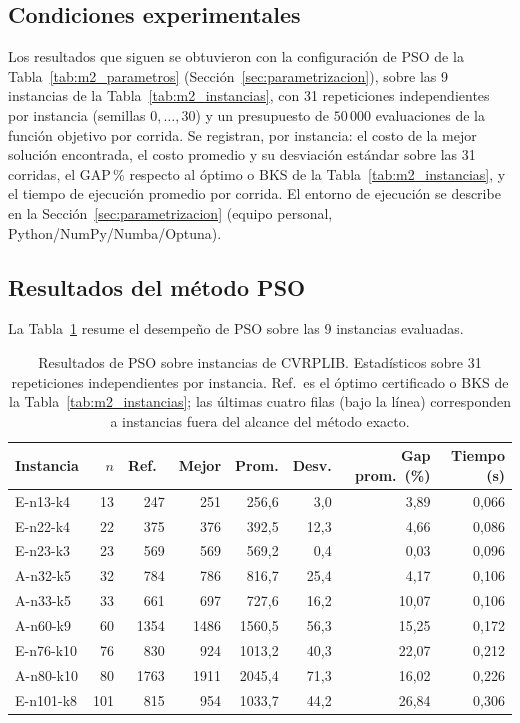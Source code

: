 \subsection{Condiciones experimentales}

Los resultados que siguen se obtuvieron con la configuración de PSO de la
Tabla~\ref{tab:m2_parametros} (Sección~\ref{sec:parametrizacion}), sobre las 9 instancias
de la Tabla~\ref{tab:m2_instancias}, con 31 repeticiones independientes por
instancia (semillas $0,\ldots,30$) y un presupuesto de $50\,000$ evaluaciones de la
función objetivo por corrida. Se registran, por instancia: el costo de la mejor solución
encontrada, el costo promedio y su desviación estándar sobre las 31 corridas, el GAP\,\%
respecto al óptimo o BKS de la Tabla~\ref{tab:m2_instancias}, y el tiempo de ejecución
promedio por corrida. El entorno de ejecución se describe en la
Sección~\ref{sec:parametrizacion} (equipo personal, Python/NumPy/Numba/Optuna).

\subsection{Resultados del método PSO}

La Tabla~\ref{tab:m2_resultados_pso} resume el desempeño de PSO sobre las 9 instancias
evaluadas.

\begin{table}[H]
\centering
\caption{Resultados de PSO sobre instancias de CVRPLIB. Estadísticos sobre 31 repeticiones
independientes por instancia. Ref.\ es el óptimo certificado o BKS de la
Tabla~\ref{tab:m2_instancias}; las últimas cuatro filas (bajo la línea) corresponden a
instancias fuera del alcance del método exacto.}
\label{tab:m2_resultados_pso}
\begin{tabular}{lrrrrrrr}
\hline
Instancia & $n$ & Ref.\ & Mejor & Prom. & Desv. & Gap prom.\ (\%) & Tiempo (s) \\
\hline
E-n13-k4  & 13  & 247  & 251  & 256{,}6  & 3{,}0  & 3{,}89  & 0{,}066 \\
E-n22-k4  & 22  & 375  & 376  & 392{,}5  & 12{,}3 & 4{,}66  & 0{,}086 \\
E-n23-k3  & 23  & 569  & 569  & 569{,}2  & 0{,}4  & 0{,}03  & 0{,}096 \\
A-n32-k5  & 32  & 784  & 786  & 816{,}7  & 25{,}4 & 4{,}17  & 0{,}106 \\
A-n33-k5  & 33  & 661  & 697  & 727{,}6  & 16{,}2 & 10{,}07 & 0{,}106 \\
\hline
A-n60-k9   & 60  & 1354 & 1486 & 1560{,}5 & 56{,}3 & 15{,}25 & 0{,}172 \\
E-n76-k10  & 76  & 830  & 924  & 1013{,}2 & 40{,}3 & 22{,}07 & 0{,}212 \\
A-n80-k10  & 80  & 1763 & 1911 & 2045{,}4 & 71{,}3 & 16{,}02 & 0{,}226 \\
E-n101-k8  & 101 & 815  & 954  & 1033{,}7 & 44{,}2 & 26{,}84 & 0{,}306 \\
\hline
\end{tabular}
\end{table}

